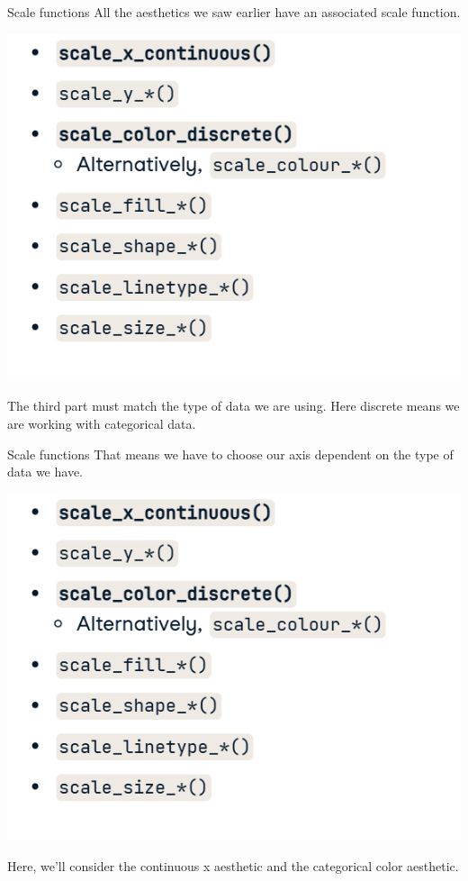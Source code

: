 \documentclass[
  ignorenonframetext,
]{beamer}
\begin{document}
\begin{frame}{Scale functions}
\label{scale-functions-2}
All the aesthetics we saw earlier have an associated scale function.

\includegraphics{../images/im159.png}

The third part must match the type of data we are using. Here discrete
means we are working with categorical data.
\end{frame}

\begin{frame}{Scale functions}
\label{scale-functions-3}
That means we have to choose our axis dependent on the type of data we
have.

\includegraphics{../images/im159.png}

Here, we'll consider the continuous x aesthetic and the categorical
color aesthetic.
\end{frame}
\end{document}
